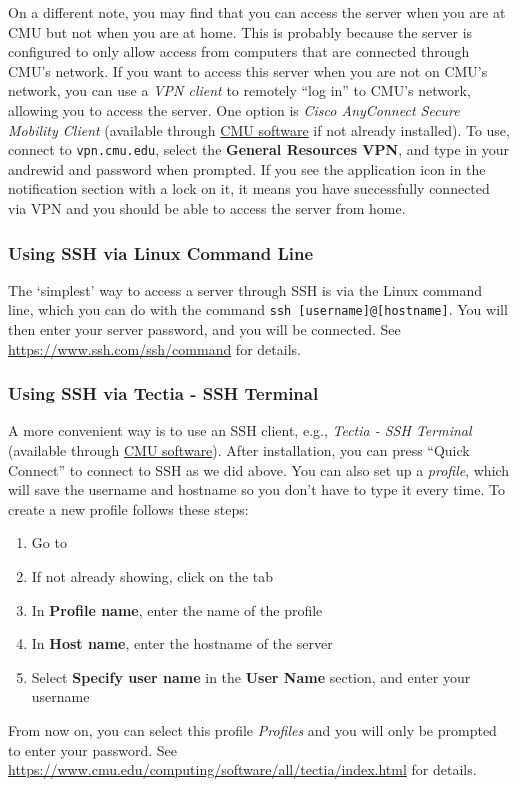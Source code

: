 \documentclass[12pt]{article}
\begin{document}
On a different note, you may find that you can access the server when you are at CMU but not when you are at home. This is probably because the server is configured to only allow access from computers that are connected through CMU's network. If you want to access this server when you are not on CMU's network, you can use a \emph{VPN client} to remotely ``log in'' to CMU's network, allowing you to access the server. One option is \emph{Cisco AnyConnect Secure Mobility Client} (available through \href{https://www.cmu.edu/computing/software}{CMU software} if not already installed). To use, connect to \texttt{vpn.cmu.edu}, select the \textbf{General Resources VPN}, and type in your andrewid and password when prompted. If you see the application icon in the notification section with a lock on it, it means you have successfully connected via VPN and you should be able to access the server from home.

\subsubsection{Using SSH via Linux Command Line}
The `simplest' way to access a server through SSH is via the Linux command line, which you can do with the command \texttt{ssh [username]@[hostname]}. You will then enter your server password, and you will be connected. See \url{https://www.ssh.com/ssh/command} for details.

\subsubsection{Using SSH via Tectia - SSH Terminal}
A more convenient way is to use an SSH client, e.g., \emph{Tectia - SSH Terminal} (available through \href{https://www.cmu.edu/computing/software}{CMU software}). After installation, you can press ``Quick Connect'' to connect to SSH as we did above. You can also set up a \emph{profile}, which will save the username and hostname so you don't have to type it every time. To create a new profile follows these steps:
\begin{enumerate}
    \item Go to 
    \item If not already showing, click on the  tab
    \item In \textbf{Profile name}, enter the name of the profile
    \item In \textbf{Host name}, enter the hostname of the server
    \item Select \textbf{Specify user name} in the \textbf{User Name} section, and enter your username
\end{enumerate}
From now on, you can select this profile \emph{Profiles} and you will only be prompted to enter your password. See \url{https://www.cmu.edu/computing/software/all/tectia/index.html} for details.
\end{document}
